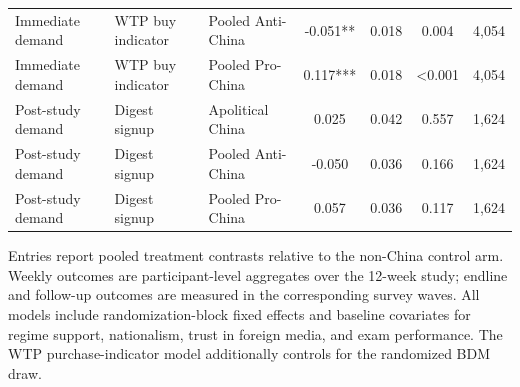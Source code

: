 \begin{table}[H]
\begin{threeparttable}
\begin{tabular}{lllcccc}
Immediate demand & WTP buy indicator & Pooled Anti-China & -0.051** & 0.018 & 0.004 & 4,054 \\
Immediate demand & WTP buy indicator & Pooled Pro-China & 0.117*** & 0.018 & <0.001 & 4,054 \\
Post-study demand & Digest signup & Apolitical China & 0.025 & 0.042 & 0.557 & 1,624 \\
Post-study demand & Digest signup & Pooled Anti-China & -0.050 & 0.036 & 0.166 & 1,624 \\
Post-study demand & Digest signup & Pooled Pro-China & 0.057 & 0.036 & 0.117 & 1,624 \\
\bottomrule
\end{tabular}
\begin{tablenotes}[flushleft]
\footnotesize
\item Entries report pooled treatment contrasts relative to the non-China control arm. Weekly outcomes are participant-level aggregates over the 12-week study; endline and follow-up outcomes are measured in the corresponding survey waves. All models include randomization-block fixed effects and baseline covariates for regime support, nationalism, trust in foreign media, and exam performance. The WTP purchase-indicator model additionally controls for the randomized BDM draw.
\end{tablenotes}
\end{threeparttable}
\end{table}
